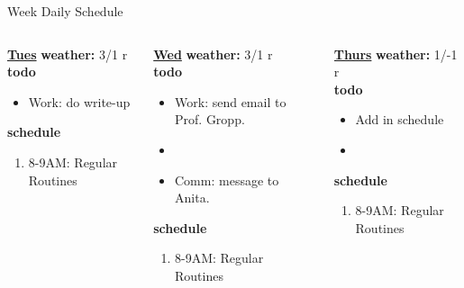 \begin{multicols}{4}
\begin{columns}
\begin{column}{0.6\linewidth}
\begin{block}{Week Daily Schedule}
\begin{columns}
          \begin{column}{0.14\textwidth}{\small \underline{\bf Tues}}
            {\bf {\tiny  weather:} } {\tiny 3/1 r} \\ 
            {\bf {\tiny todo}}\\ 
            \begin{itemize}
              \tiny \item \tiny Work: do write-up 
            \end{itemize} 
                {{\bf {\tiny  schedule}}}
                \begin{enumerate} 
                  \tiny \item \tiny 8-9AM: Regular Routines 
                \end{enumerate} 
          \end{column}
          \begin{column}{0.14\textwidth}{\small \underline{\bf Wed}}
            {\tiny \bf weather: } {\tiny 3/1 r} \\ 
            {\tiny {\bf todo}}\\
            \begin{itemize}
              \tiny \item \tiny Work: send email to Prof. Gropp. 
            \item \tiny 
            \item \tiny Comm: message to Anita. 
            \end{itemize} 
                {\tiny \bf schedule}\\
                \begin{enumerate} 
                  \tiny \item \tiny 8-9AM: Regular Routines 
                \end{enumerate} 
          \end{column}

          \begin{column}{0.14\textwidth}{\small \underline{\bf Thurs}}
            {\tiny \bf weather: } {\tiny 1/-1 r }\\ 
            {\tiny \bf todo} \\ 
            \begin{itemize}
              \tiny \item \tiny Add in schedule
            \item \tiny 
            \end{itemize} 
                {\tiny {\bf schedule}} \\
                \begin{enumerate} 
                  \tiny \item \tiny 8-9AM: Regular Routines 
                \end{enumerate}
          \end{column} 
          

\end{columns}
\end{block}
\end{column}
\end{columns}
\end{multicols}
